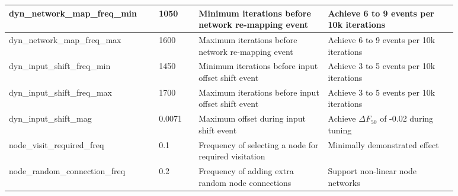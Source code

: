 \begin{longtable}{| p{0.28\linewidth} | C{0.08\linewidth} | p{0.26\linewidth} | p{0.26\linewidth} | }
dyn\_network\_map\_freq\_min & 1050 & Minimum iterations before network re-mapping event & Achieve 6 to 9 events per 10k iterations \\ \hline
dyn\_network\_map\_freq\_max & 1600 & Maximum iterations before network re-mapping event & Achieve 6 to 9 events per 10k iterations \\ \hline
dyn\_input\_shift\_freq\_min & 1450 & Minimum iterations before input offset shift event & Achieve 3 to 5 events per 10k iterations \\ \hline
dyn\_input\_shift\_freq\_max & 1700 & Maximum iterations before input offset shift event & Achieve 3 to 5 events per 10k iterations \\ \hline
dyn\_input\_shift\_mag & 0.0071 & Maximum offset during input shift event & Achieve $\Delta F_{50}$ of -0.02 during tuning \\ \hline
node\_visit\_required\_freq & 0.1 & Frequency of selecting a node for required visitation & Minimally demonstrated effect \\ \hline
node\_random\_connection\_freq & 0.2 & Frequency of adding extra random node connections & Support non-linear node networks \\ \hline


\end{longtable}
